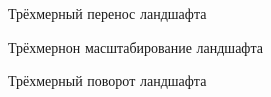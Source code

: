 \begin{figure}
	\caption{Трёхмерный перенос ландшафта}
	\label{move}
\end{figure}

\begin{figure}
	\caption{Трёхмернон масштабирование ландшафта}
	\label{scale}
\end{figure}

\begin{figure}
	\caption{Трёхмерный поворот ландшафта}
	\label{rotate}
\end{figure}

